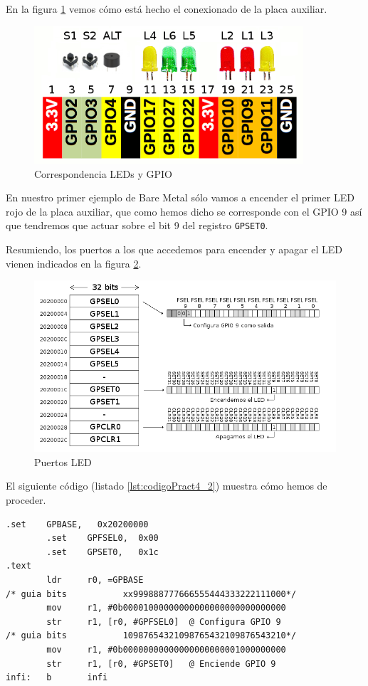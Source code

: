 En la figura \ref{fig:pinoutpeque} vemos cómo está hecho el conexionado de la placa auxiliar.

\begin{figure}[h]
  \centering
    \includegraphics[width=10cm]{graphs/RaspberryGPIOaux.png}
  \caption{Correspondencia LEDs y GPIO}
  \label{fig:pinoutpeque}
\end{figure}


En nuestro primer ejemplo de Bare Metal sólo vamos a encender el primer LED rojo
de la placa auxiliar, que como hemos dicho se corresponde con el GPIO 9 así que
tendremos que actuar sobre el bit 9 del registro {\tt GPSET0}.

Resumiendo, los puertos a los que accedemos para encender y apagar el LED
vienen indicados en la figura \ref{fig:gpio1}.

\begin{figure}[h]
  \centering
    \includegraphics[width=14cm]{graphs/gpio1.png}
  \caption{Puertos LED}
  \label{fig:gpio1}
\end{figure}

El siguiente código (listado \ref{lst:codigoPract4_2}) muestra cómo hemos de proceder.

\newpage
\begin{lstlisting}[caption={esbn2.s},label={lst:codigoPract4_2}]
        .set    GPBASE,   0x20200000
        .set    GPFSEL0,  0x00
        .set    GPSET0,   0x1c
.text
        ldr     r0, =GPBASE
/* guia bits           xx999888777666555444333222111000*/
        mov     r1, #0b00001000000000000000000000000000
        str     r1, [r0, #GPFSEL0]  @ Configura GPIO 9
/* guia bits           10987654321098765432109876543210*/
        mov     r1, #0b00000000000000000000001000000000
        str     r1, [r0, #GPSET0]   @ Enciende GPIO 9
infi:   b       infi
\end{lstlisting}


